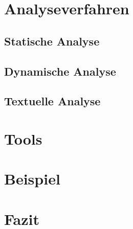 \chapter{Analyseverfahren}
\section{Statische Analyse}
\section{Dynamische Analyse}
\section{Textuelle Analyse}

\chapter{Tools}
\chapter{Beispiel}
\chapter{Fazit}